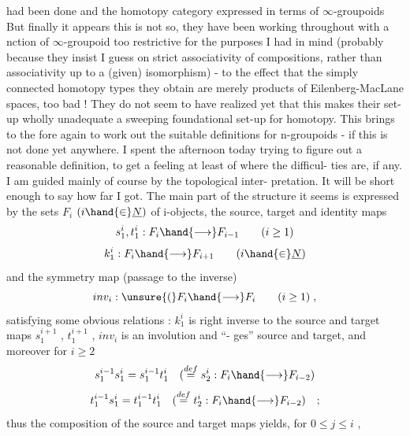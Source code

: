 
had been done and the homotopy category expressed in terms of $\infty$-groupoids
But finally it appears this is not so,  they have been working throughout
with a nction of $\infty$-groupoid too restrictive for the purposes I had in
mind (probably because they insist I guess on strict associativity of
compositions,  rather than associativity up to a (given) isomorphism) -
to the effect that the simply connected homotopy types they obtain are
merely products of Eilenberg-MacLane spaces,  too bad !  They do not seem
to have realized yet that this makes their set-up wholly unadequate  
a sweeping foundational set-up for homotopy.  This brings to the fore
again to work out the suitable definitions for n-groupoids -  if this is
not done yet anywhere.  I spent the afternoon today trying to figure out
a reasonable definition,  to get a feeling at least of where the difficul-%
ties are, if any.  I am guided mainly of course by the topological inter-%
pretation.  It will be short enough to say how far I got.  The main part
of the structure it seems is expressed by the sets $F_i$ $(i\hand{\in}\underline{N})$ of i-objects,
the source, target and identity maps
\[ s^i_1, t^i_1 : F_i \hand{\longrightarrow} F_{i-1} \qquad (i \geq 1) \]
\[ k^i_1 : F_i \hand{\longrightarrow} F_{i+1} \qquad (i \hand{\in} \underline{N}) \]
and the symmetry map (passage to the inverse)
\[ inv_i : \unsure{(}F_i \hand{\longrightarrow} F_i \qquad (i \geq 1) \;, \]
satisfying some obvious relations :  $k^i_1$ is right inverse to the 
source and target maps $s^{i+1}_1$ , $t^{i+1}_1$ ,  $inv_i$  is an involution and ``-%
ges'' source and target,  and moreover for  $i \geq 2$
\[ s^{i-1}_1 s^i_1 = s^{i-1}_1 t^i_1 \quad (\overset{def}{=} s^i_2 : F_i \hand{\longrightarrow} F_{i-2}) \]
\[ t^{i-1}_1 s^i_1 = t^{i-1}_1 t^i_1 \quad (\overset{def}{=} t^i_2 : F_i \hand{\longrightarrow} F_{i-2}) \quad ; \]
thus the composition of the source and target maps yields,  for  $0 \leqslant j \leqslant i$ ,
